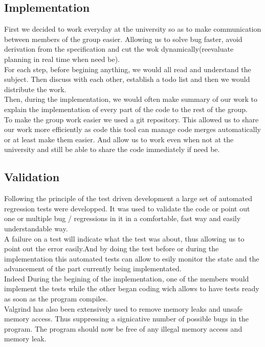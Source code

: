 \subsection{Implementation}
First we decided to work everyday at the university so as to make communication between members of the group easier.
Allowing us to solve bug faster, avoid derivation from the specification and cut the wok dynamically(reevaluate 
planning in real time when need be).\\
For each step, before begining anything, we would all read and understand the subject. Then discuss with each other,
establish a todo list and then we would distribute the work. \\ 
Then, during the implementation, we would often make summary of our work to explain the implementation of every part 
of the code to the rest of the group.\\
To make the group work easier we used a git repository. This allowed us to share our work more efficiently as code
this tool can manage code merges automatically or at least make them easier. And allow us to work even when not
at the university and still be able to share the code immediately if need be.\\

\subsection{Validation}
Following the principle of the test driven development a large set of automated regression tests were developped. 
It was used to validate the code or point out one or multiple bug / regressions in it in a comfortable, fast
way and easily understandable way. \\
A failure on a test will indicate what the test was about, thus allowing us to point out the error easily.And by 
doing the test before or during the implementation this automated tests can allow to esily monitor the state and the
advancement of the part currently being implementated.\\ Indeed During the begining of the  implementation, one of 
the members would implement the tests while the other began coding wich allows to have tests ready as soon as the 
program compiles. \\
Valgrind has also been extensively used to remove memory leaks and unsafe memory access. Thus suppressing a 
signicative number of possible bugs in the program. The program should now be free of any illegal memory access
and memory leak.

